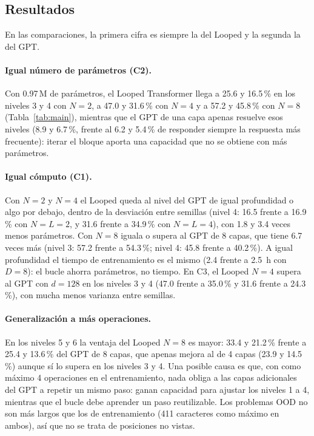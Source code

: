 \subsection{Resultados}

En las comparaciones, la primera cifra es siempre la del Looped y la segunda la
del GPT.

\paragraph{Igual número de parámetros (C2).}
Con 0.97\,M de parámetros, el Looped Transformer llega a 25.6 y 16.5\,\% en los
niveles 3 y 4 con $N{=}2$, a 47.0 y 31.6\,\% con $N{=}4$ y a 57.2 y 45.8\,\% con
$N{=}8$ (Tabla~\ref{tab:main}), mientras que el GPT de una capa apenas resuelve
esos niveles (8.9 y 6.7\,\%, frente al 6.2 y 5.4\,\% de responder siempre la
respuesta más frecuente): iterar el bloque aporta una capacidad que no se
obtiene con más parámetros.

\paragraph{Igual cómputo (C1).}
Con $N{=}2$ y $N{=}4$ el Looped queda al nivel del GPT de igual profundidad o
algo por debajo, dentro de la desviación entre semillas (nivel 4: 16.5 frente a
16.9\,\% con $N{=}L{=}2$, y 31.6 frente a 34.9\,\% con $N{=}L{=}4$), con 1.8 y 3.4
veces menos parámetros. Con $N{=}8$ iguala o supera al GPT de 8 capas, que tiene
6.7 veces más (nivel 3: 57.2 frente a 54.3\,\%; nivel 4: 45.8 frente a
40.2\,\%). A igual profundidad el tiempo de entrenamiento es el mismo (2.4 frente
a 2.5~h con $D{=}8$): el bucle ahorra parámetros, no tiempo. En C3, el Looped
$N{=}4$ supera al GPT con $d{=}128$ en los niveles 3 y 4 (47.0 frente a 35.0\,\% y
31.6 frente a 24.3\,\%), con mucha menos varianza entre semillas.

\paragraph{Generalización a más operaciones.}
En los niveles 5 y 6 la ventaja del Looped $N{=}8$ es mayor: 33.4 y 21.2\,\%
frente a 25.4 y 13.6\,\% del GPT de 8 capas, que apenas mejora al de 4 capas
(23.9 y 14.5\,\%) aunque sí lo supera en los niveles 3 y 4. Una posible causa es
que, con como máximo 4 operaciones en el entrenamiento, nada obliga a las capas
adicionales del GPT a repetir un mismo paso: ganan capacidad para ajustar los
niveles 1 a 4, mientras que el bucle debe aprender un paso reutilizable. Los
problemas OOD no son más largos que los de entrenamiento (411 caracteres como
máximo en ambos), así que no se trata de posiciones no vistas.


